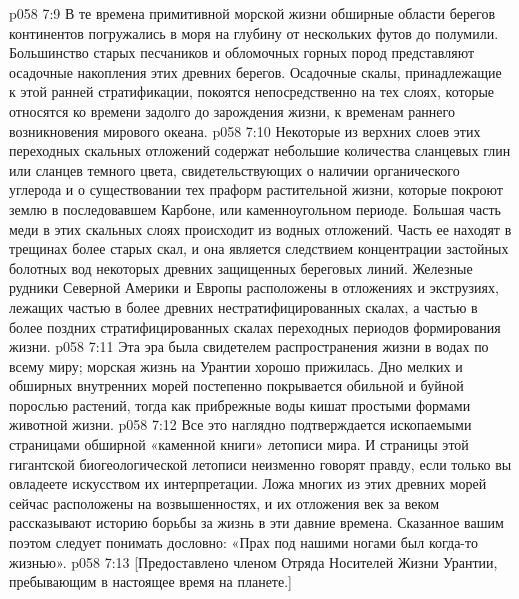 \vs p058 7:9 В те времена примитивной морской жизни обширные области берегов континентов погружались в моря на глубину от нескольких футов до полумили. Большинство старых песчаников и обломочных горных пород представляют осадочные накопления этих древних берегов. Осадочные скалы, принадлежащие к этой ранней стратификации, покоятся непосредственно на тех слоях, которые относятся ко времени задолго до зарождения жизни, к временам раннего возникновения мирового океана.
\vs p058 7:10 Некоторые из верхних слоев этих переходных скальных отложений содержат небольшие количества сланцевых глин или сланцев темного цвета, свидетельствующих о наличии органического углерода и о существовании тех праформ растительной жизни, которые покроют землю в последовавшем Карбоне, или каменноугольном периоде. Большая часть меди в этих скальных слоях происходит из водных отложений. Часть ее находят в трещинах более старых скал, и она является следствием концентрации застойных болотных вод некоторых древних защищенных береговых линий. Железные рудники Северной Америки и Европы расположены в отложениях и экструзиях, лежащих частью в более древних нестратифицированных скалах, а частью в более поздних стратифицированных скалах переходных периодов формирования жизни.
\vs p058 7:11 \pc Эта эра была свидетелем распространения жизни в водах по всему миру; морская жизнь на Урантии хорошо прижилась. Дно мелких и обширных внутренних морей постепенно покрывается обильной и буйной порослью растений, тогда как прибрежные воды кишат простыми формами животной жизни.
\vs p058 7:12 \pc Все это наглядно подтверждается ископаемыми страницами обширной «каменной книги» летописи мира. И страницы этой гигантской биогеологической летописи неизменно говорят правду, если только вы овладеете искусством их интерпретации. Ложа многих из этих древних морей сейчас расположены на возвышенностях, и их отложения век за веком рассказывают историю борьбы за жизнь в эти давние времена. Сказанное вашим поэтом следует понимать дословно: «Прах под нашими ногами был когда\hyp{}то жизнью».
\vsetoff
\vs p058 7:13 [Предоставлено членом Отряда Носителей Жизни Урантии, пребывающим в настоящее время на планете.]
